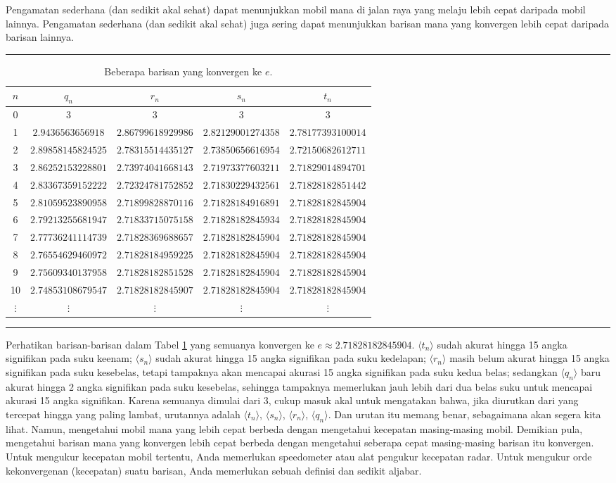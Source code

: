 Pengamatan sederhana (dan sedikit akal sehat) dapat menunjukkan mobil
mana di jalan raya yang melaju lebih cepat daripada mobil lainnya.
Pengamatan sederhana (dan sedikit akal sehat) juga sering dapat menunjukkan
barisan mana yang konvergen lebih cepat daripada barisan lainnya.
\begin{table}[h]
\hrule \caption{\label{tab:convergenceTo2.718281828...}Beberapa barisan yang konvergen
ke $e$.}
\medskip{}

\centering{}%
\begin{tabular}{c|cccc}
$n$ & $q_{n}$ & $r_{n}$ & $s_{n}$ & $t_{n}$\tabularnewline
\hline 
0 & 3 & 3 & 3 & 3\tabularnewline
1 & $2.9436563656918$ & $2.86799618929986$ & $2.82129001274358$ & $2.78177393100014$\tabularnewline
2 & $2.89858145824525$ & $2.78315514435127$ & $2.73850656616954$ & $2.72150682612711$\tabularnewline
3 & $2.86252153228801$ & $2.73974041668143$ & $2.71973377603211$ & $2.71829014894701$\tabularnewline
4 & $2.83367359152222$ & $2.72324781752852$ & $2.71830229432561$ & $2.71828182851442$\tabularnewline
5 & $2.81059523890958$ & $2.71899828870116$ & $2.71828184916891$ & $2.71828182845904$\tabularnewline
6 & $2.79213255681947$ & $2.71833715075158$ & $2.71828182845934$ & $2.71828182845904$\tabularnewline
7 & $2.77736241114739$ & $2.71828369688657$ & $2.71828182845904$ & $2.71828182845904$\tabularnewline
8 & $2.76554629460972$ & $2.71828184959225$ & $2.71828182845904$ & $2.71828182845904$\tabularnewline
9 & $2.75609340137958$ & $2.71828182851528$ & $2.71828182845904$ & $2.71828182845904$\tabularnewline
10 & $2.74853108679547$ & $2.71828182845907$ & $2.71828182845904$ & $2.71828182845904$\tabularnewline
$\vdots$ & $\vdots$ & $\vdots$ & $\vdots$ & $\vdots$\tabularnewline
\end{tabular}\medskip{}
\hrule 
\end{table}
 Perhatikan barisan-barisan dalam Tabel \ref{tab:convergenceTo2.718281828...}
yang semuanya konvergen ke $e\approx2.71828182845904$. $\langle t_{n}\rangle$
sudah akurat hingga 15 angka signifikan pada suku keenam; $\langle s_{n}\rangle$
sudah akurat hingga 15 angka signifikan pada suku kedelapan; $\langle r_{n}\rangle$
masih belum akurat hingga 15 angka signifikan pada suku kesebelas,
tetapi tampaknya akan mencapai akurasi 15 angka signifikan pada suku
kedua belas; sedangkan $\langle q_{n}\rangle$ baru akurat hingga
2 angka signifikan pada suku kesebelas, sehingga tampaknya memerlukan
jauh lebih dari dua belas suku untuk mencapai akurasi 15 angka signifikan.
Karena semuanya dimulai dari 3, cukup masuk akal untuk mengatakan
bahwa, jika diurutkan dari yang tercepat hingga yang paling lambat,
urutannya adalah $\langle t_{n}\rangle$, $\langle s_{n}\rangle$,
$\langle r_{n}\rangle$, $\langle q_{n}\rangle$. Dan urutan itu memang
benar, sebagaimana akan segera kita lihat. Namun, mengetahui mobil
mana yang lebih cepat berbeda dengan mengetahui kecepatan masing-masing
mobil. Demikian pula, mengetahui barisan mana yang konvergen lebih
cepat berbeda dengan mengetahui seberapa cepat masing-masing barisan
itu konvergen. Untuk mengukur kecepatan mobil tertentu, Anda memerlukan
speedometer atau alat pengukur kecepatan radar. Untuk mengukur orde
kekonvergenan (kecepatan) suatu barisan, Anda memerlukan sebuah definisi
dan sedikit aljabar. 


